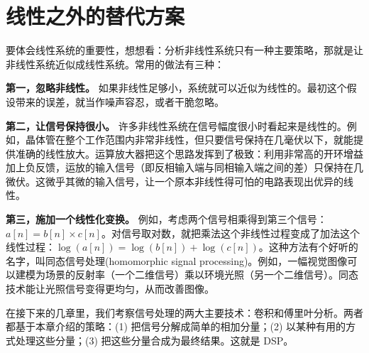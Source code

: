 \section{线性之外的替代方案}

要体会线性系统的重要性，想想看：分析非线性系统只有一种主要策略，那就是让非线性系统近似成线性系统。常用的做法有三种：

\textbf{第一，忽略非线性。}
如果非线性足够小，系统就可以近似为线性的。最初这个假设带来的误差，就当作噪声容忍，或者干脆忽略。

\textbf{第二，让信号保持很小。}
许多非线性系统在信号幅度很小时看起来是线性的。例如，晶体管在整个工作范围内非常非线性，但只要信号保持在几毫伏以下，就能提供准确的线性放大。运算放大器把这个思路发挥到了极致：利用非常高的开环增益加上负反馈，运放的输入信号（即反相输入端与同相输入端之间的差）只保持在几微伏。这微乎其微的输入信号，让一个原本非线性得可怕的电路表现出优异的线性。

\textbf{第三，施加一个线性化变换。}
例如，考虑两个信号相乘得到第三个信号：\(a[n] = b[n] \times c[n]\)。对信号取对数，就把乘法这个非线性过程变成了加法这个线性过程：\(\log(a[n]) = \log(b[n]) + \log(c[n])\)。这种方法有个好听的名字，叫同态信号处理(homomorphic
signal
processing)。例如，一幅视觉图像可以建模为场景的反射率（一个二维信号）乘以环境光照（另一个二维信号）。同态技术能让光照信号变得更均匀，从而改善图像。

在接下来的几章里，我们考察信号处理的两大主要技术：卷积和傅里叶分析。两者都基于本章介绍的策略：(1)
把信号分解成简单的相加分量；(2) 以某种有用的方式处理这些分量；(3)
把这些分量合成为最终结果。这就是 DSP。
